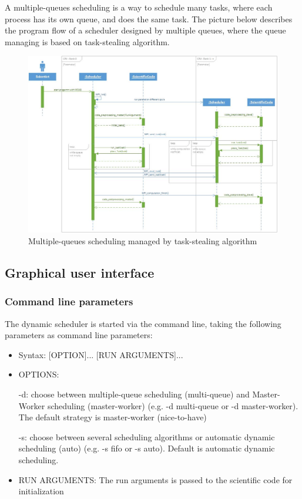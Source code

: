\vspace{0.5cm}
A multiple-queues scheduling is a way to schedule many tasks, where each process has its own queue, and does the same task. The picture below describes the program flow of a scheduler designed by multiple queues, where the queue managing is based on task-stealing algorithm.
\vspace{1cm}
	\begin{figure}[H]
	\centering
	\includegraphics[width=15cm]{images/Task-stealing.jpg}
	\caption{Multiple-queues scheduling managed by task-stealing algorithm}
	\end{figure}
\newpage
	
\subsection{Graphical user interface}
	\subsubsection{Command line parameters}
		The dynamic scheduler is started via the command line, taking the following parameters as command line parameters:
	
		\begin{itemize}	
			\item Syntax: [OPTION]... [RUN ARGUMENTS]...
				
			\item OPTIONS:
							
				\subitem -d: choose between multiple-queue scheduling (multi-queue) and Master-Worker scheduling (master-worker) (e.g. -d multi-queue or -d master-worker). The default strategy is master-worker (nice-to-have)
				
				\subitem -s: choose between several scheduling algorithms or automatic dynamic scheduling (auto) (e.g. -s fifo or -s auto). Default is automatic dynamic scheduling.
					
			\item RUN ARGUMENTS:
				\subitem The run arguments is passed to the scientific code for initialization
		\end{itemize}
		
